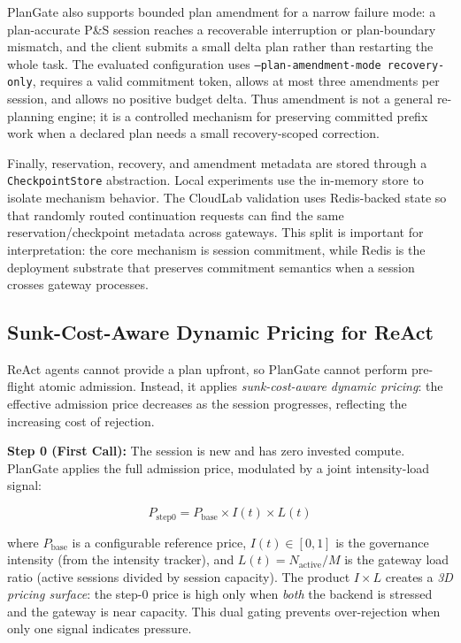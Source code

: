 \documentclass[sigconf,review,anonymous]{acmart}
\begin{document}
PlanGate also supports bounded plan amendment for a narrow failure mode: a plan-accurate P\&S session reaches a recoverable interruption or plan-boundary mismatch, and the client submits a small delta plan rather than restarting the whole task. The evaluated configuration uses \texttt{--plan-amendment-mode recovery-only}, requires a valid commitment token, allows at most three amendments per session, and allows no positive budget delta. Thus amendment is not a general re-planning engine; it is a controlled mechanism for preserving committed prefix work when a declared plan needs a small recovery-scoped correction.

Finally, reservation, recovery, and amendment metadata are stored through a \texttt{CheckpointStore} abstraction. Local experiments use the in-memory store to isolate mechanism behavior. The CloudLab validation uses Redis-backed state so that randomly routed continuation requests can find the same reservation/checkpoint metadata across gateways. This split is important for interpretation: the core mechanism is session commitment, while Redis is the deployment substrate that preserves commitment semantics when a session crosses gateway processes.

\subsection{Sunk-Cost-Aware Dynamic Pricing for ReAct}
\label{sec:sunkcost}

ReAct agents cannot provide a plan upfront, so PlanGate cannot perform pre-flight atomic admission. Instead, it applies \emph{sunk-cost-aware dynamic pricing}: the effective admission price decreases as the session progresses, reflecting the increasing cost of rejection.


\textbf{Step 0 (First Call):} The session is new and has zero invested compute. PlanGate applies the full admission price, modulated by a joint intensity-load signal:

\begin{equation}
\label{eq:step0}
P_{\text{step0}} = P_{\text{base}} \times I(t) \times L(t)
\end{equation}

\noindent where $P_{\text{base}}$ is a configurable reference price, $I(t) \in [0, 1]$ is the governance intensity (from the intensity tracker), and $L(t) = N_{\text{active}} / M$ is the gateway load ratio (active sessions divided by session capacity). The product $I \times L$ creates a \emph{3D pricing surface}: the step-0 price is high only when \emph{both} the backend is stressed and the gateway is near capacity. This dual gating prevents over-rejection when only one signal indicates pressure.
\end{document}
